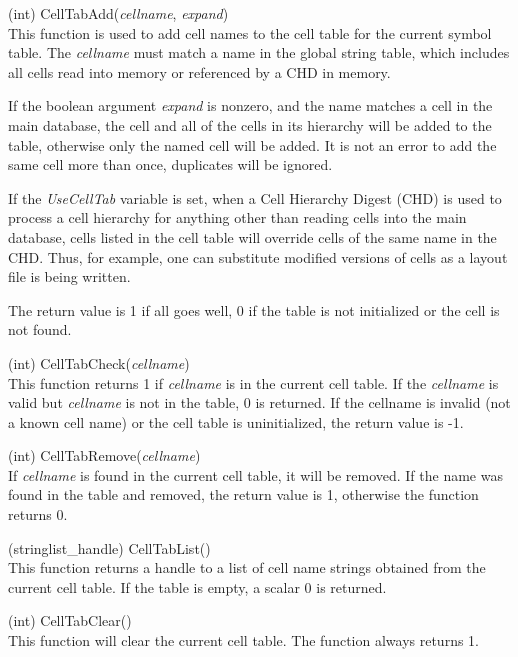 \begin{description}
\item{(int) \vt CellTabAdd({\it cellname\/}, {\it expand\/})}\\
This function is used to add cell names to the cell table for the
current symbol table.  The {\it cellname} must match a name in the
global string table, which includes all cells read into memory or
referenced by a CHD in memory.

If the boolean argument {\it expand} is nonzero, and the name matches
a cell in the main database, the cell and all of the cells in its
hierarchy will be added to the table, otherwise only the named cell
will be added.  It is not an error to add the same cell more than
once, duplicates will be ignored.

If the {\it UseCellTab} variable is set, when a Cell Hierarchy Digest
(CHD) is used to process a cell hierarchy for anything other than
reading cells into the main database, cells listed in the cell table
will override cells of the same name in the CHD.  Thus, for example,
one can substitute modified versions of cells as a layout file is
being written.

The return value is 1 if all goes well, 0 if the table is not
initialized or the cell is not found.

\item{(int) \vt CellTabCheck({\it cellname\/})}\\
This function returns 1 if {\it cellname} is in the current cell
table.  If the {\it cellname} is valid but {\it cellname} is not in
the table, 0 is returned.  If the cellname is invalid (not a known
cell name) or the cell table is uninitialized, the return value is -1.

\item{(int) \vt CellTabRemove({\it cellname\/})}\\
If {\it cellname} is found in the current cell table, it will be
removed.  If the name was found in the table and removed, the return
value is 1, otherwise the function returns 0.

\item{(stringlist\_handle) \vt CellTabList()}\\
This function returns a handle to a list of cell name strings obtained
from the current cell table.  If the table is empty, a scalar 0 is
returned.

\item{(int) \vt CellTabClear()}\\
This function will clear the current cell table.  The function always
returns 1.

\end{description}


